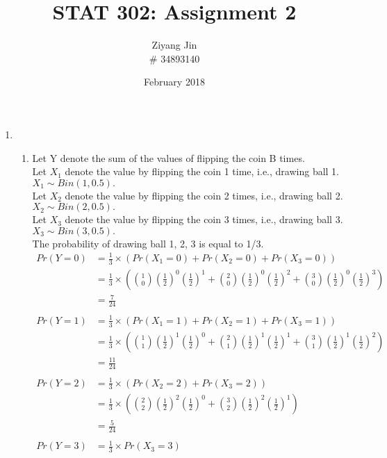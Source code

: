 \documentclass[11pt]{article}
\title{STAT 302: Assignment 2}
\author{Ziyang Jin \\
\# 34893140}
\date{February 2018}
\begin{document}
\maketitle

\begin{enumerate}[label=\textbf{Question \arabic*:},start=1]

\item 
\begin{enumerate}
\item Let Y denote the sum of the values of flipping the coin B times.\\
Let \(X_1\) denote the value by flipping the coin 1 time, i.e., drawing ball 1. \( X_1 \sim Bin(1, 0.5).\) \\
Let \(X_2\) denote the value by flipping the coin 2 times, i.e., drawing ball 2. \( X_2 \sim Bin(2, 0.5).\) \\
Let \(X_3\) denote the value by flipping the coin 3 times, i.e., drawing ball 3. \( X_3 \sim Bin(3, 0.5).\) \\
The probability of drawing ball 1, 2, 3 is equal to 1/3.\\
\begin{equation}
\begin{split}
Pr(Y=0) & = \frac{1}{3} \times (Pr(X_1 = 0) + Pr(X_2 = 0) + Pr(X_3 = 0)) \\
& = \frac{1}{3} \times ({1 \choose 0}(\frac{1}{2})^0(\frac{1}{2})^1 + {2 \choose 0}(\frac{1}{2})^0(\frac{1}{2})^2 + {3 \choose 0}(\frac{1}{2})^0(\frac{1}{2})^3) \\
& = \frac{7}{24} \\
\\
Pr(Y=1) & = \frac{1}{3} \times (Pr(X_1 = 1) + Pr(X_2 = 1) + Pr(X_3 = 1)) \\
& = \frac{1}{3} \times ({1 \choose 1}(\frac{1}{2})^1(\frac{1}{2})^0 + {2 \choose 1}(\frac{1}{2})^1(\frac{1}{2})^1 + {3 \choose 1}(\frac{1}{2})^1(\frac{1}{2})^2) \\
& = \frac{11}{24} \\
\\
Pr(Y=2) & = \frac{1}{3} \times (Pr(X_2 = 2) + Pr(X_3 = 2)) \\
& = \frac{1}{3} \times ({2 \choose 2}(\frac{1}{2})^2(\frac{1}{2})^0 + {3 \choose 2}(\frac{1}{2})^2(\frac{1}{2})^1) \\
& = \frac{5}{24} \\
\\
Pr(Y=3) & = \frac{1}{3} \times Pr(X_3 = 3) \\

\end{split}
\end{equation}
\end{enumerate}
\end{enumerate}
\end{document}
